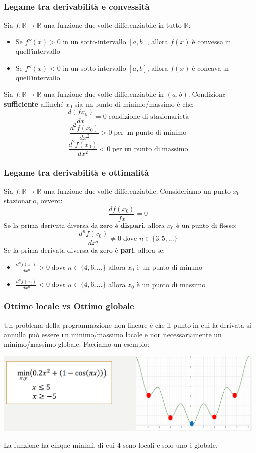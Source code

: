\documentclass[12pt]{article}
\begin{document}
\subsubsection{Legame tra derivabilità e convessità}
Sia $f:\mathbb{R} \rightarrow \mathbb{R}$ una funzione due volte differenziabile in tutto $\mathbb{R}$:
\begin{itemize}
    \item Se $f''(x) > 0$ in un sotto-intervallo $[a,b]$, allora $f(x)$ è convessa in quell'intervallo
    \item Se $f''(x) < 0$ in un sotto-intervallo $[a,b]$, allora $f(x)$ è concava in quell'intervallo
\end{itemize}
Sia $f:\mathbb{R} \rightarrow \mathbb{R}$ una funzione due volte differenziabile in $(a,b)$. Condizione \textbf{sufficiente} affinché $x_0$ sia un punto di minimo/massimo è che:
$$\frac{d(fx_0)}{dx} = 0 \; \textrm{condizione di stazionarietà}$$
$$\frac{d^2f(x_0)}{dx^2} > 0 \; \textrm{per un punto di minimo}$$
$$\frac{d^2f(x_0)}{dx^2} < 0 \; \textrm{per un punto di massimo}$$
\subsubsection{Legame tra derivabilità e ottimalità}
Sia $f:\mathbb{R} \rightarrow \mathbb{R}$ una funzione due volte differenziabile. Consideriamo un punto $x_0$ stazionario, ovvero:
$$\frac{df(x_0)}{fx} = 0$$
Se la prima derivata diversa da zero è \textbf{dispari}, allora $x_0$ è un punto di flesso:
$$\frac{d^nf(x_0)}{dx^n} \neq 0 \; \textrm{dove } n \in \{3,5,...\}$$
Se la prima derivata diversa da zero è \textbf{pari}, allora se:
\begin{itemize}
    \item $\frac{d^nf(x_0)}{dx^n} > 0 \; \textrm{dove } n \in \{4,6,...\}$ allora $x_0$ è un punto di minimo
    \item $\frac{d^nf(x_0)}{dx^n} < 0 \; \textrm{dove } n \in \{4,6,...\}$ allora $x_0$ è un punto di massimo
\end{itemize}
\subsubsection{Ottimo locale vs Ottimo globale}
Un problema della programmazione non lineare è che il punto in cui la derivata si annulla può essere un minimo/massimo locale e non necessariamente
un minimo/massimo globale. Facciamo un esempio:
\begin{center}
    \includegraphics[width = 1\linewidth]{Images/93.png}
\end{center}
La funzione ha cinque minimi, di cui 4 sono locali e solo uno è globale.
\end{document}
